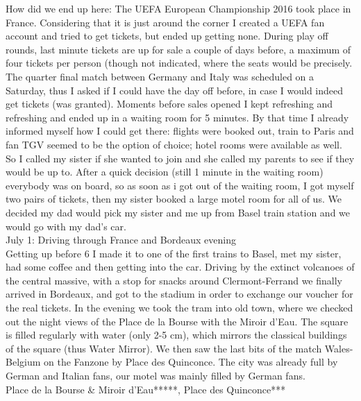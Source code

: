 How did we end up here: The UEFA European Championship 2016 took place in France. Considering that it is just around the corner I created a UEFA fan account and tried to get tickets, but ended up getting none. During play off rounds, last minute tickets are up for sale a couple of days before, a maximum of four tickets per person (though not indicated, where the seats would be precisely. The quarter final match between Germany and Italy was scheduled on a Saturday, thus I asked if I could have the day off before, in case I would indeed get tickets (was granted). Moments before sales opened I kept refreshing and refreshing and ended up in a waiting room for 5 minutes. By that time I already informed myself how I could get there: flights were booked out, train to Paris and fan TGV seemed to be the option of choice; hotel rooms were available as well. So I called my sister if she wanted to join and she called my parents to see if they would be up to. After a quick decision (still 1 minute in the waiting room) everybody was on board, so as soon as i got out of the waiting room, I got myself two pairs of tickets, then my sister booked a large motel room for all of us. We decided my dad would pick my sister and me up from Basel train station and we would go with my dad's car.\\

July 1: Driving through France and Bordeaux evening\\
Getting up before 6 I made it to one of the first trains to Basel, met my sister, had some coffee and then getting into the car. Driving by the extinct volcanoes of the central massive, with a stop for snacks around Clermont-Ferrand we finally arrived in Bordeaux, and got to the stadium in order to exchange our voucher for the real tickets. In the evening we took the tram into old town, where we checked out the night views of the Place de la Bourse with the Miroir d'Eau. The square is filled regularly with water (only 2-5 cm), which mirrors the classical buildings of the square (thus Water Mirror). We then saw the last bits of the match Wales-Belgium on the Fanzone by Place des Quinconce. The city was already full by German and Italian fans, our motel was mainly filled by German fans.\\

Place de la Bourse \& Miroir d'Eau*****, Place des Quinconce***\\


